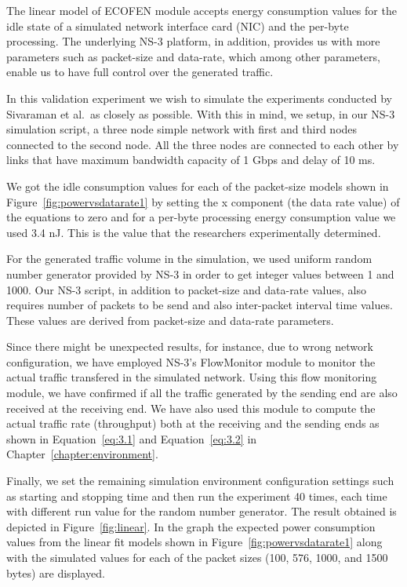 The linear model of ECOFEN module accepts energy consumption values for the idle state of a simulated network interface card (NIC) and the per-byte processing. The underlying NS-3 platform, in addition, provides us with more parameters such as packet-size and data-rate, which among other parameters, enable us to have full control over the generated traffic.

In this validation experiment we wish to simulate the experiments conducted by Sivaraman et al.~as closely as possible. With this in mind, we setup, in our NS-3 simulation script, a three node simple network with first and third nodes connected to the second node. All the three nodes are connected to each other by links that have maximum bandwidth capacity of 1 Gbps and delay of 10 ms. 

We got the idle consumption values for each of the packet-size models shown in Figure~\ref{fig:powervsdatarate1} by setting the x component (the data rate value) of the equations to zero and for a per-byte processing energy consumption value we used 3.4 nJ. This is the value that the researchers experimentally determined. 

For the generated traffic volume in the simulation, we used uniform random number generator provided by NS-3 in order to get integer values between 1 and 1000. Our NS-3 script, in addition to packet-size and data-rate values, also requires number of packets to be send and also inter-packet interval time values. These values are derived from packet-size and data-rate parameters. 

Since there might be unexpected results, for instance, due to wrong network configuration, we have employed NS-3's FlowMonitor module to monitor the actual traffic transfered in the simulated network. Using this flow monitoring module, we have confirmed if all the traffic generated by the sending end are also received at the receiving end. We have also used this module to compute the actual traffic rate (throughput) both at the receiving and the sending ends as shown in Equation~\ref{eq:3.1} and Equation~\ref{eq:3.2} in Chapter~\ref{chapter:environment}.

Finally, we set the remaining simulation environment configuration settings such as starting and stopping time and then run the experiment 40 times, each time with different run value for the random number generator. The result obtained is depicted in Figure~\ref{fig:linear}. In the graph the expected power consumption values from the linear fit models shown in Figure~\ref{fig:powervsdatarate1} along with the simulated values for each of the packet sizes (100, 576, 1000, and 1500 bytes) are displayed.

